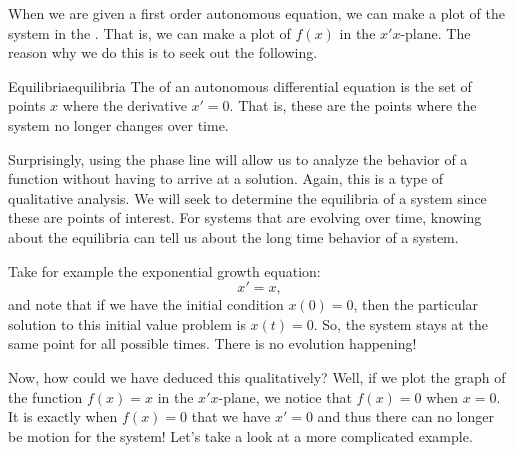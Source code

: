                When we are given a first order autonomous equation, we can make a plot of the system in the . That is, we can make a plot of $f(x)$ in the $x'x$-plane.  The reason why we do this is to seek out the following.

                \begin{df}{Equilibria}{equilibria}
                    The  of an autonomous differential equation is the set of points $x$ where the derivative $x'=0$. That is, these are the points where the system no longer changes over time.
                \end{df}

                Surprisingly, using the phase line will allow us to analyze the behavior of a function without having to arrive at a solution. Again, this is a type of qualitative analysis. We will seek to determine the equilibria of a system since these are points of interest. For systems that are evolving over time, knowing about the equilibria can tell us about the long time behavior of a system.

                Take for example the exponential growth equation:
                \[
                x'=x,
                \]
                and note that if we have the initial condition $x(0)=0$, then the particular solution to this initial value problem is $x(t)=0$.  So, the system stays at the same point for all possible times.  There is no evolution happening!

                Now, how could we have deduced this qualitatively? Well, if we plot the graph of the function $f(x)=x$ in the $x'x$-plane, we notice that $f(x)=0$ when $x=0$.  It is exactly when $f(x)=0$ that we have $x'=0$ and thus there can no longer be motion for the system! Let's take a look at a more complicated example.



